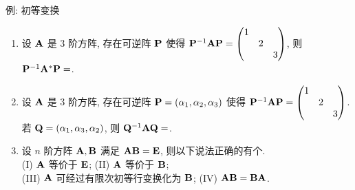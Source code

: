 \begin{frame}{例: 初等变换}
	\onslide<+->
	\begin{exercise}
		\begin{enumerate}
			\item 设 ${\mathbf{A}}$ 是 $3$ 阶方阵, 存在可逆阵 ${\mathbf{P}}$ 使得 ${\mathbf{P}}^{-1}{\mathbf{A}}{\mathbf{P}}=\begin{pmatrix}
				1&&\\&2&\\&&3
			\end{pmatrix}$, 则 ${\mathbf{P}}^{-1}{\mathbf{A}}^*{\mathbf{P}}=$.
			\item 设 ${\mathbf{A}}$ 是 $3$ 阶方阵, 存在可逆阵 ${\mathbf{P}}=(\alpha_1,\alpha_2,\alpha_3)$ 使得 ${\mathbf{P}}^{-1}{\mathbf{A}}{\mathbf{P}}=\begin{pmatrix}
				1&&\\&2&\\&&3
			\end{pmatrix}$.
			若 ${\mathbf{Q}}=(\alpha_1,\alpha_3,\alpha_2)$, 则 ${\mathbf{Q}}^{-1}{\mathbf{A}}{\mathbf{Q}}=$.
			\item 设 $n$ 阶方阵 ${\mathbf{A}},{\mathbf{B}}$ 满足 ${\mathbf{A}}{\mathbf{B}}={\mathbf{E}}$, 则以下说法正确的有个.\\
			(I) ${\mathbf{A}}$ 等价于 ${\mathbf{E}}$;\hspace{45mm}
			(II) ${\mathbf{A}}$ 等价于 ${\mathbf{B}}$;\\
			(III) ${\mathbf{A}}$ 可经过有限次初等行变换化为 ${\mathbf{B}}$;\hspace{4mm}
			(IV) ${\mathbf{A}}{\mathbf{B}}={\mathbf{B}}{\mathbf{A}}$.
		\end{enumerate}
	\end{exercise}
\end{frame}


